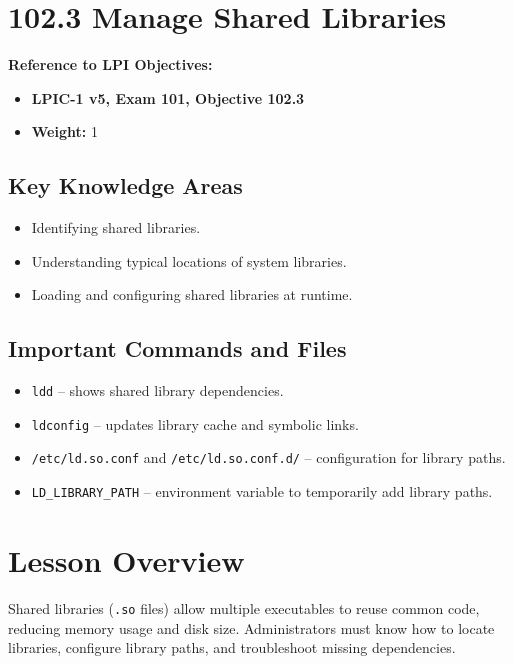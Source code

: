 \documentclass[a4paper]{report}
\begin{document}


\newpage

\section*{102.3 Manage Shared Libraries}

\textbf{Reference to LPI Objectives:}
\begin{itemize}
    \item \textbf{LPIC-1 v5, Exam 101, Objective 102.3}
    \item \textbf{Weight:} 1
\end{itemize}

\subsection*{Key Knowledge Areas}
\begin{itemize}
    \item Identifying shared libraries.
    \item Understanding typical locations of system libraries.
    \item Loading and configuring shared libraries at runtime.
\end{itemize}

\subsection*{Important Commands and Files}
\begin{itemize}
    \item \texttt{ldd} – shows shared library dependencies.
    \item \texttt{ldconfig} – updates library cache and symbolic links.
    \item \texttt{/etc/ld.so.conf} and \texttt{/etc/ld.so.conf.d/} – configuration for library paths.
    \item \texttt{LD\_LIBRARY\_PATH} – environment variable to temporarily add library paths.
\end{itemize}

\section*{Lesson Overview}

Shared libraries (\texttt{.so} files) allow multiple executables to reuse common code, reducing memory usage and disk size. Administrators must know how to locate libraries, configure library paths, and troubleshoot missing dependencies.
\end{document}
